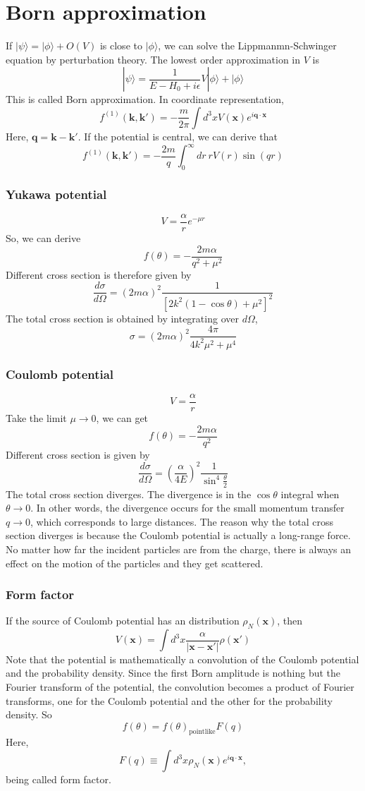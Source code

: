 \documentclass[cyan]{elegantnote}
\begin{document}
\section{Born approximation}
If $|\psi\rangle = |\phi\rangle + O(V)$ is close to $|\phi\rangle$, we can solve the Lippmanmn-Schwinger equation by perturbation theory. The lowest order approximation in $V$ is
\[|\psi\rangle = \frac{1}{E-H_0 + i\epsilon} V|\phi\rangle + |\phi\rangle\]
This is called Born approximation. In coordinate representation,
\[f^{(1)}(\bm{k},\bm{k}') = - \frac{m}{2\pi} \int d^3x V(\bm{x}) e^{i\bm{q}\cdot\bm{x}}\]
Here, $\bm{q} = \bm{k} - \bm{k}'$. If the potential is central, we can derive that
\[f^{(1)}(\bm{k},\bm{k}') = - \frac{2m}{q} \int_0^{\infty} dr \: r V(r) \sin(qr)\]

\subsubsection{Yukawa potential}
\[V = \frac{\alpha}{r}  e^{-\mu r}\]
So, we can derive
\[f(\theta) = - \frac{2m\alpha}{q^2 + \mu^2}\]
Different cross section is therefore given by
\[\frac{d\sigma}{d\Omega} = (2m\alpha)^2 \frac{1}{[2k^2(1-\cos\theta) + \mu^2]^2}\]
The total cross section is obtained by integrating over $d\Omega$,
\[\sigma = (2m\alpha)^2 \frac{4\pi}{4k^2\mu^2 + \mu^4}\]

\subsubsection{Coulomb potential}
\[V = \frac{\alpha}{r}\]
Take the limit $\mu \to 0$, we can get
\[f(\theta) = - \frac{2m\alpha}{q^2}\]
Different cross section is given by
\[\frac{d\sigma}{d\Omega} = (\frac{\alpha}{4E})^2 \frac{1}{\sin^4{\frac{\theta}{2}}}\]
The total cross section diverges. The divergence is in the $\cos\theta$ integral when $\theta \to 0$. In other words, the divergence occurs for the small momentum transfer $q \to 0$, which corresponds to large distances.
The reason why the total cross section diverges is because the Coulomb potential is actually a long-range force. No matter how far the incident particles are from the charge, there is always an effect on the motion of the particles and they get scattered.

\subsubsection{Form factor}
\noindent
If the source of Coulomb potential has an distribution $\rho_N(\bm{x})$, then
\[V(\bm{x}) = \int d^3x \frac{\alpha}{|\bm{x}-\bm{x}'|} \rho(\bm{x}')\]
Note that the potential is mathematically a convolution of the Coulomb potential and the probability density. Since the first Born amplitude is nothing but the Fourier transform of the potential, the convolution becomes a product of Fourier transforms, one for the Coulomb potential and the other for the probability density. So
\[f(\theta) = f(\theta)_{\mathrm{pointlike}} F(q)\]
Here,
\[F(q) \equiv \int d^3x \rho_N(\bm{x}) e^{i \bm{q} \cdot \bm{x}},\]
being called form factor.
\end{document}
